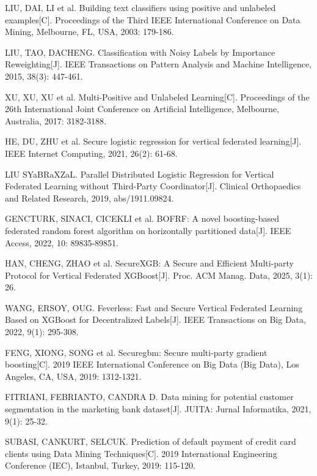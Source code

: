 \begin{thebibliography}{200}
	LIU, DAI, LI et al. Building text classifiers using positive and unlabeled examples[C]. Proceedings of the Third IEEE International Conference on Data Mining, Melbourne, FL, USA, 2003: 179-186.

	LIU, TAO, DACHENG. Classification with Noisy Labels by Importance Reweighting[J]. IEEE Transactions on Pattern Analysis and Machine Intelligence, 2015, 38(3): 447-461.

	XU, XU, XU et al. Multi-Positive and Unlabeled Learning[C]. Proceedings of the 26th International Joint Conference on Artificial Intelligence, Melbourne, Australia, 2017: 3182-3188.

	HE, DU, ZHU et al. Secure logistic regression for vertical federated learning[J]. IEEE Internet Computing, 2021, 26(2): 61-68.

	LIU SYaBRaXZaL. Parallel Distributed Logistic Regression for Vertical Federated Learning
	without Third-Party Coordinator[J]. Clinical Orthopaedics and Related Research, 2019, abs/1911.09824.

	GENCTURK, SINACI, CICEKLI et al. BOFRF: A novel boosting-based federated random forest algorithm on horizontally partitioned data[J]. IEEE Access, 2022, 10: 89835-89851.

	HAN, CHENG, ZHAO et al. SecureXGB: A Secure and Efficient Multi-party Protocol for Vertical Federated XGBoost[J]. Proc. ACM Manag. Data, 2025, 3(1): 26.

	WANG, ERSOY, OUG. Feverless: Fast and Secure Vertical Federated Learning Based on XGBoost for Decentralized Labels[J]. IEEE Transactions on Big Data, 2022, 9(1): 295-308.

	FENG, XIONG, SONG et al. Securegbm: Secure multi-party gradient boosting[C]. 2019 IEEE International Conference on Big Data (Big Data), Los Angeles, CA, USA, 2019: 1312-1321.

	FITRIANI, FEBRIANTO, CANDRA D. Data mining for potential customer segmentation in the marketing bank dataset[J]. JUITA: Jurnal Informatika, 2021, 9(1): 25-32.

	SUBASI, CANKURT, SELCUK. Prediction of default payment of credit card clients using Data Mining Techniques[C]. 2019 International Engineering Conference (IEC), Istanbul, Turkey, 2019: 115-120.


\end{thebibliography}
